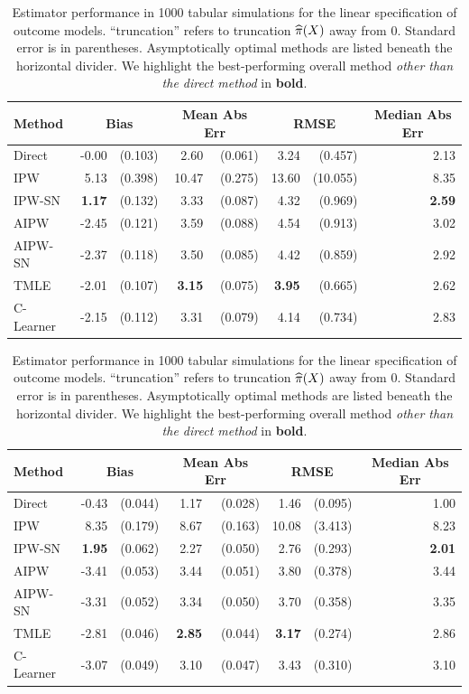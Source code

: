 \begin{table}[H]
\begin{subtable}{\linewidth}
\centering
\caption{$N=200$, truncation threshold 5\%} %
\begin{tabular}{lrrrrrrr}
\toprule
 Method & \multicolumn{2}{c}{Bias} &  \multicolumn{2}{c}{Mean Abs Err} &  \multicolumn{2}{c}{RMSE} &  \multicolumn{1}{c}{Median Abs Err} \\
\midrule
Direct & -0.00 & (0.103) & 2.60 & (0.061) & 3.24 & (0.457) & 2.13 \\ 
IPW & 5.13 & (0.398) & 10.47 & (0.275) & 13.60 & (10.055) & 8.35 \\ 
IPW-SN & \textbf{1.17} & (0.132) & 3.33 & (0.087) & 4.32 & (0.969) & \textbf{2.59} \\ 
\greymidrule
AIPW & -2.45 & (0.121) & 3.59 & (0.088) & 4.54 & (0.913) & 3.02 \\ 
AIPW-SN & -2.37 & (0.118) & 3.50 & (0.085) & 4.42 & (0.859) & 2.92 \\ 
TMLE & -2.01 & (0.107) & \textbf{3.15} & (0.075) & \textbf{3.95} & (0.665) & 2.62 \\ 
C-Learner & -2.15 & (0.112) & 3.31 & (0.079) & 4.14 & (0.734) & 2.83 \\ 
\bottomrule
\end{tabular}
\end{subtable}

\begin{subtable}{\linewidth}
\centering
\caption{$N=1000$, truncation threshold 5\%} %
\begin{tabular}{lrrrrrrr}
\toprule
 Method & \multicolumn{2}{c}{Bias} &  \multicolumn{2}{c}{Mean Abs Err} &  \multicolumn{2}{c}{RMSE} &  \multicolumn{1}{c}{Median Abs Err} \\
\midrule
Direct & -0.43 & (0.044) & 1.17 & (0.028) & 1.46 & (0.095) & 1.00 \\ 
IPW &  8.35 & (0.179) & 8.67 & (0.163) & 10.08 & (3.413) & 8.23 \\ 
IPW-SN & \textbf{1.95} & (0.062) & 2.27 & (0.050) & 2.76 & (0.293) & \textbf{2.01} \\
\greymidrule
AIPW & -3.41 & (0.053) & 3.44 & (0.051) & 3.80 & (0.378) & 3.44 \\ 
AIPW-SN &  -3.31 & (0.052) & 3.34 & (0.050) & 3.70 & (0.358) & 3.35 \\ 
TMLE & -2.81 & (0.046) & \textbf{2.85} & (0.044) & \textbf{3.17} & (0.274) & 2.86 \\ 
C-Learner & -3.07 & (0.049) & 3.10 & (0.047) & 3.43 & (0.310) & 3.10 \\ 
\bottomrule
\end{tabular}
\end{subtable}
    \caption{Estimator performance in 1000 tabular simulations for the linear specification of outcome models. ``truncation'' refers to truncation $\widehat{\pi}(X)$ away from 0. Standard error is in parentheses. Asymptotically optimal methods are listed beneath the horizontal divider. We highlight the best-performing overall method \emph{other than the direct method} in \textbf{bold}.} %
    \label{tb:linear_simulation_full}
    \vspace{-1em}
\end{table}





